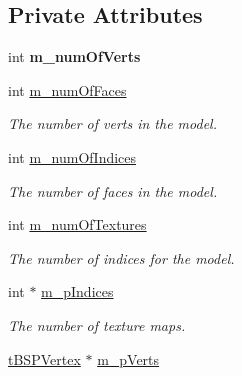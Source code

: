 \subsection*{Private Attributes}
\begin{DoxyCompactItemize}
\item 
int {\bfseries m\+\_\+num\+Of\+Verts}\hypertarget{class_b_s_pfile_a4ace6677bd15bc1e1476f24e0c2864f1}{}\label{class_b_s_pfile_a4ace6677bd15bc1e1476f24e0c2864f1}

\item 
int \hyperlink{class_b_s_pfile_a12bfa8c7e0d985dd89193bce795f2613}{m\+\_\+num\+Of\+Faces}\hypertarget{class_b_s_pfile_a12bfa8c7e0d985dd89193bce795f2613}{}\label{class_b_s_pfile_a12bfa8c7e0d985dd89193bce795f2613}

\begin{DoxyCompactList}\small\item\em The number of verts in the model. \end{DoxyCompactList}\item 
int \hyperlink{class_b_s_pfile_a764cccbff1b8f80ef366f35c4edc721e}{m\+\_\+num\+Of\+Indices}\hypertarget{class_b_s_pfile_a764cccbff1b8f80ef366f35c4edc721e}{}\label{class_b_s_pfile_a764cccbff1b8f80ef366f35c4edc721e}

\begin{DoxyCompactList}\small\item\em The number of faces in the model. \end{DoxyCompactList}\item 
int \hyperlink{class_b_s_pfile_a862b3f1249427bcacf1ade8362b753c8}{m\+\_\+num\+Of\+Textures}\hypertarget{class_b_s_pfile_a862b3f1249427bcacf1ade8362b753c8}{}\label{class_b_s_pfile_a862b3f1249427bcacf1ade8362b753c8}

\begin{DoxyCompactList}\small\item\em The number of indices for the model. \end{DoxyCompactList}\item 
int $\ast$ \hyperlink{class_b_s_pfile_aa86af87121864c5cfef95e5278241f7b}{m\+\_\+p\+Indices}\hypertarget{class_b_s_pfile_aa86af87121864c5cfef95e5278241f7b}{}\label{class_b_s_pfile_aa86af87121864c5cfef95e5278241f7b}

\begin{DoxyCompactList}\small\item\em The number of texture maps. \end{DoxyCompactList}\item 
\hyperlink{structt_b_s_p_vertex}{t\+B\+S\+P\+Vertex} $\ast$ \hyperlink{class_b_s_pfile_a6ddf2eae40c66dad1e2306aab2b79c4b}{m\+\_\+p\+Verts}\hypertarget{class_b_s_pfile_a6ddf2eae40c66dad1e2306aab2b79c4b}{}\label{class_b_s_pfile_a6ddf2eae40c66dad1e2306aab2b79c4b}


\end{DoxyCompactItemize}
